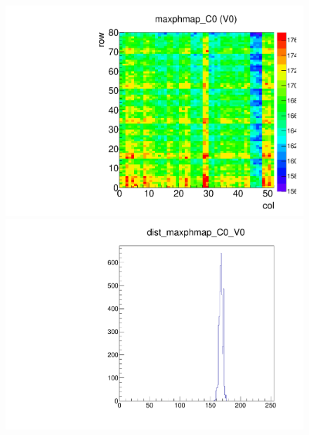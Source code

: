 \begin{figure}[!Hp]
\centering
\begin{minipage}{0.45\textwidth}
  \includegraphics[width=1.0\textwidth]{figures/phopt_maxphmap.pdf}
  \caption{}
  \label{fig:phopt_maxphmap}
\end{minipage}
\hspace{0.3cm}
\begin{minipage}{0.45\textwidth}
  \includegraphics[width=1.0\textwidth]{figures/phopt_dist_maxphmap.pdf}
  \caption{}
  \label{fig:phopt_dist_maxphmap}
\end{minipage}
\end{figure}


